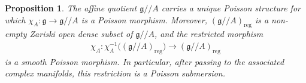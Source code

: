 \documentclass[11pt,reqno]{amsart}
\newtheorem*{theorem A}{Main Theorem A}
\newtheorem*{theorem B}{Main Theorem B}
\newtheorem*{theorem C}{Main Theorem C}
\newtheorem*{theorem D}{Main Theorem D}
\newtheorem{proposition}[theorem]{Proposition}
\theoremstyle{definition}
\theoremstyle{plain}
\theoremstyle{conclusion}
\begin{document}
\begin{proposition} 
\label{prop:smoothregularg} \cite[Proposition 1.26]{Brion2010Actions}
The affine quotient $\mathfrak{g}//A$ carries a unique Poisson structure for which $\chi_A:\mathfrak{g}\to\mathfrak{g}//A$ is a Poisson morphism. Moreover, $(\mathfrak{g}//A)_{\mathrm{reg}}$ is a non-empty Zariski open dense subset of $\mathfrak{g}//A$, and the restricted morphism \begin{align*} \chi_A:\chi_A^{-1}\bigl((\mathfrak{g}//A)_{\mathrm{reg}}\bigr)\longrightarrow(\mathfrak{g}//A)_{\mathrm{reg}} \end{align*} is a smooth Poisson morphism. In particular, after passing to the associated complex manifolds, this restriction is a Poisson submersion.
\end{proposition}
\end{document}
